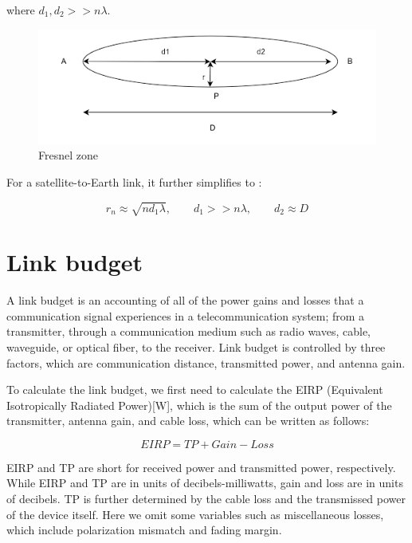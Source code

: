 \documentclass[a4paper,12pt]{report}
\begin{document}
where $d_1, d_2 >> n\lambda$.

\begin{figure}
  \begin{center}
    \includegraphics[clip, keepaspectratio, width=0.5\linewidth]{img/fresnel_zone.png}
    \caption{Fresnel zone}
    \label{fig:fresnel_zone}
  \end{center}
\end{figure}

For a satellite-to-Earth link, it further simplifies to \cite{inbook}:

\begin{equation}
  r_n \approx \sqrt{n d_1 \lambda}, \qquad d_1 >> n\lambda, \qquad d_2 \approx D
\end{equation}


\section{Link budget}

A link budget is an accounting of all of the power gains and losses
that a communication signal experiences in a telecommunication system;
from a transmitter, through a communication medium such as radio waves,
cable, waveguide, or optical fiber, to the receiver.
Link budget is controlled by three factors, 
which are communication distance, transmitted power, and antenna gain.

To calculate the link budget,
we first need to calculate the EIRP (Equivalent Isotropically Radiated Power)[W],
which is the sum of the output power of the transmitter, antenna gain, and cable loss,
which can be written as follows:

\begin{equation}
  EIRP = TP + Gain - Loss
\end{equation}

EIRP and TP are short for received power and transmitted power, respectively.
While EIRP and TP are in units of decibels-milliwatts,
gain and loss are in units of decibels.
TP is further determined by the cable loss and the transmissed power
of the device itself.
Here we omit some variables such as miscellaneous losses,
which include polarization mismatch and fading margin.
\end{document}
